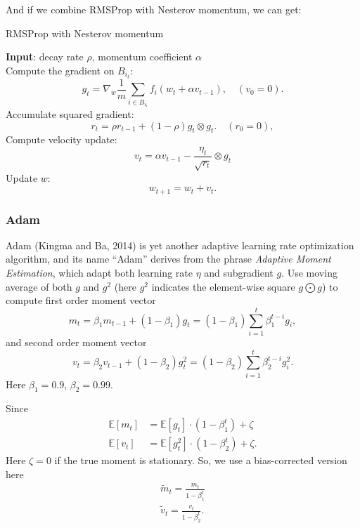 And if we combine RMSProp  with Nesterov momentum, we can get:

\begin{algorithm}[H]
\caption{RMSProp with Nesterov momentum}
\label{alg:RMSPropNesterov}
{\bf Input}: decay rate $\rho$, momentum coefficient $\alpha$\\
Compute the gradient on $B_{i_t}$:
\begin{equation}
g_t = \nabla_{w} \frac{1}{m} \sum_{i \in B_{i_t}} f_i(w_{t} + \alpha v_{t-1}), \quad (v_0 = 0).
\end{equation}
Accumulate squared gradient:
\begin{equation}
r_t = \rho r_{t-1} + (1-\rho)g_t \otimes g_t. \quad (r_0 = 0),
\end{equation}
Compute velocity update:
\begin{equation}
v_t = \alpha v_{t-1} -\frac{\eta_t}{\sqrt{{r_t}}} \otimes g_t
\end{equation}
Update $w$:
\begin{equation}
w_{t+1} = w_t + v_t.
\end{equation}
\end{algorithm}

\subsubsection{Adam}
Adam (Kingma and Ba, 2014) is yet another adaptive learning rate optimization algorithm, and its name ``Adam'' derives from the phrase \emph{Adaptive Moment Estimation}, which adapt both learning rate $\eta$ and subgradient $g$.
Use moving average of both $g$ and $g^2$ (here $g^2$ indicates the element-wise square $g \bigodot g$) to compute first order moment vector
\begin{equation}
m_t  =\beta_1 m_{t-1} + (1-\beta_1) g_t=(1-\beta_1)\sum_{i=1}^{t}\beta_1^{t-i} g_i ,
\end{equation}
and second order moment vector
\begin{equation}
v_t  =\beta_2 v_{t-1} + (1-\beta_2) g_t^2=(1-\beta_2)\sum_{i=1}^{t}\beta_2^{t-i} g^2_i.
\end{equation}
Here $\beta_1 = 0.9$, $\beta_2 = 0.99$.

Since
\begin{align}
\mathbb{E} \left[ m_t \right] & =\mathbb{E} \left[ g_t \right] \cdot (1-\beta_1^t) +\zeta\\
\mathbb{E} \left[ v_t \right] & =\mathbb{E} \left[ g^2_t \right] \cdot (1-\beta_2^t) +\zeta.
\end{align}
Here $\zeta=0$ if the true moment is stationary.
So, we use a bias-corrected version here
\begin{align}
\tilde{m}_t=\frac{m_t}{1-\beta_1^t} \\
\tilde{v}_t=\frac{v_t}{1-\beta_2^t}.	
\end{align}

